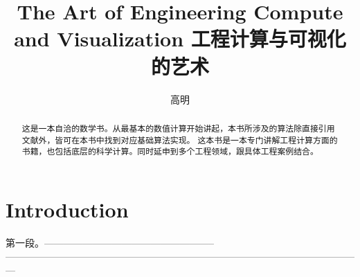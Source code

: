 \documentclass{ctexart}
\title  {\Large The Art of Engineering Compute and Visualization \newline \newline \newline 工程计算与可视化的艺术}
\author{高明}
\begin{document}
	\maketitle
	
	\newpage
	
	\begin{abstract}
		这是一本自洽的数学书。从最基本的数值计算开始讲起，本书所涉及的算法除直接引用文献外，皆可在本书中找到对应基础算法实现。\newline
		这本书是一本专门讲解工程计算方面的书籍，也包括底层的科学计算。同时延申到多个工程领域，跟具体工程案例结合。
	\end{abstract}
	
	\section{Introduction}
	
	第一段。-----------------------------------------------------              ---------------------------------------------------------------------------------------------------------------
	
	
	
\end{document}
